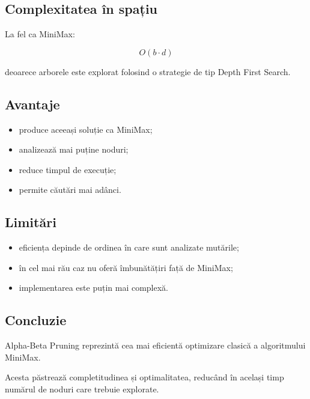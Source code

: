 \documentclass[12pt,a4paper]{article}
\begin{document}
\subsection{Complexitatea în spațiu}

La fel ca MiniMax:

\[
O(b \cdot d)
\]

deoarece arborele este explorat folosind o strategie de tip Depth First Search.

\subsection{Avantaje}

\begin{itemize}
\item produce aceeași soluție ca MiniMax;
\item analizează mai puține noduri;
\item reduce timpul de execuție;
\item permite căutări mai adânci.
\end{itemize}

\subsection{Limitări}

\begin{itemize}
\item eficiența depinde de ordinea în care sunt analizate mutările;
\item în cel mai rău caz nu oferă îmbunătățiri față de MiniMax;
\item implementarea este puțin mai complexă.
\end{itemize}

\subsection{Concluzie}

Alpha-Beta Pruning reprezintă cea mai eficientă optimizare clasică a algoritmului MiniMax.

Acesta păstrează completitudinea și optimalitatea, reducând în același timp numărul de noduri care trebuie explorate.
\end{document}
